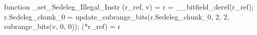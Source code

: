 function _set_Sedeleg_Illegal_Instr (r_ref, v) = {
    r = __bitfield_deref(r_ref);
    r.Sedeleg_chunk_0 = update_subrange_bits(r.Sedeleg_chunk_0, 2, 2, subrange_bits(v, 0, 0));
    (*r_ref) = r
}
